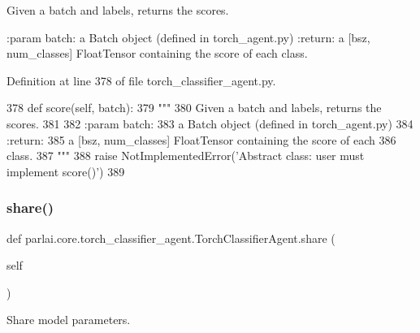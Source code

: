 \begin{DoxyVerb}Given a batch and labels, returns the scores.

:param batch:
    a Batch object (defined in torch_agent.py)
:return:
    a [bsz, num_classes] FloatTensor containing the score of each
    class.
\end{DoxyVerb}
 

Definition at line 378 of file torch\+\_\+classifier\+\_\+agent.\+py.


\begin{DoxyCode}
378     \textcolor{keyword}{def }score(self, batch):
379         \textcolor{stringliteral}{"""}
380 \textcolor{stringliteral}{        Given a batch and labels, returns the scores.}
381 \textcolor{stringliteral}{}
382 \textcolor{stringliteral}{        :param batch:}
383 \textcolor{stringliteral}{            a Batch object (defined in torch\_agent.py)}
384 \textcolor{stringliteral}{        :return:}
385 \textcolor{stringliteral}{            a [bsz, num\_classes] FloatTensor containing the score of each}
386 \textcolor{stringliteral}{            class.}
387 \textcolor{stringliteral}{        """}
388         \textcolor{keywordflow}{raise} NotImplementedError(\textcolor{stringliteral}{'Abstract class: user must implement score()'})
389 \end{DoxyCode}
\mbox{\label{classparlai_1_1core_1_1torch__classifier__agent_1_1TorchClassifierAgent_a33e56566ee5e81b257b049bd6a3c1cd6}} 
\subsubsection{\texorpdfstring{share()}{share()}}
{\footnotesize\ttfamily def parlai.\+core.\+torch\+\_\+classifier\+\_\+agent.\+Torch\+Classifier\+Agent.\+share (\begin{DoxyParamCaption}\item[{}]{self }\end{DoxyParamCaption})}

\begin{DoxyVerb}Share model parameters.
\end{DoxyVerb}
 

